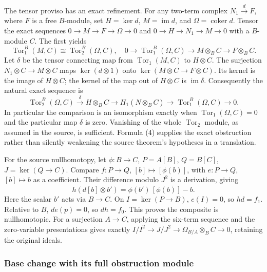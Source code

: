 The tensor proviso has an exact refinement. For any two-term complex \(N_1\xrightarrow d F\), where \(F\) is a free \(B\)-module, set \(H=\ker d\), \(M=\operatorname{im}d\), and \(\Omega=\operatorname{coker}d\). Tensor the exact sequences \(0\to M\to F\to\Omega\to0\) and \(0\to H\to N_1\to M\to0\) with a \(B\)-module \(C\). The first yields \[
\operatorname{Tor}_1^B(M,C)\cong\operatorname{Tor}_2^B(\Omega,C),
\quad
0\to\operatorname{Tor}_1^B(\Omega,C)\to M\otimes_B C\to F\otimes_B C.
\] Let \(\delta\) be the tensor connecting map from \(\operatorname{Tor}_1(M,C)\) to \(H\otimes C\). The surjection \(N_1\otimes C\to M\otimes C\) maps \(\ker(d\otimes1)\) onto \(\ker(M\otimes C\to F\otimes C)\). Its kernel is the image of \(H\otimes C\); the kernel of the map out of \(H\otimes C\) is \(\operatorname{im}\delta\). Consequently the natural exact sequence is \[
\operatorname{Tor}_2^B(\Omega,C)\xrightarrow\delta H\otimes_B C
\longrightarrow H_1(N\otimes_B C)
\longrightarrow\operatorname{Tor}_1^B(\Omega,C)\longrightarrow0.\tag{4}
\] In particular the comparison is an isomorphism exactly when \(\operatorname{Tor}_1(\Omega,C)=0\) and the particular map \(\delta\) is zero. Vanishing of the whole \(\operatorname{Tor}_2\) module, as assumed in the source, is sufficient. Formula (4) supplies the exact obstruction rather than silently weakening the source theorem's hypotheses in a translation.

For the source nullhomotopy, let \(\phi:B\to C\), \(P=A[B]\), \(Q=B[C]\), \(J=\ker(Q\to C)\). Compare \(f:P\to Q\), \([b]\mapsto[\phi(b)]\), with \(e:P\to Q\), \([b]\mapsto b\) as a coefficient. Their difference modulo \(J^2\) is a derivation, giving \[
h(d[b]\otimes b')=\phi(b')\,\overline{[\phi(b)]-b}.
\] Here the scalar \(b'\) acts via \(B\to C\). On \(I=\ker(P\to B)\), \(e(I)=0\), so \(hd=f_1\). Relative to \(B\), \(de(p)=0\), so \(dh=f_0\). This proves the composite is nullhomotopic. For a surjection \(A\to C\), applying the six-term sequence and the zero-variable presentations gives exactly \(I/I^2\to J/J^2\to\Omega_{B/A}\otimes_B C\to0\), retaining the original ideals.

\subsubsection{Base change with its full obstruction module}\label{base-change-with-its-full-obstruction-module}

